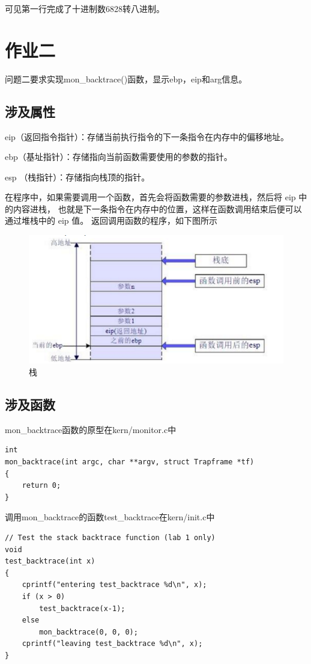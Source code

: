 \documentclass[12pt,a4paper,UTF8]{article}
\begin{document}
可见第一行完成了十进制数6828转八进制。

\section{作业二}

\setcounter{table}{0}
\setcounter{figure}{0}

问题二要求实现mon\_backtrace()函数，显示ebp，eip和arg信息。

	\subsection{涉及属性}
	eip（返回指令指针）：存储当前执行指令的下一条指令在内存中的偏移地址。

	ebp（基址指针）：存储指向当前函数需要使用的参数的指针。

	esp （栈指针）：存储指向栈顶的指针。

	在程序中，如果需要调用一个函数，首先会将函数需要的参数进栈，然后将 eip 中的内容进栈，
	也就是下一条指令在内存中的位置，这样在函数调用结束后便可以通过堆栈中的 eip 值。
	返回调用函数的程序，如下图所示
	\begin{figure}[H]
		\centering
		\includegraphics[width = .8\linewidth]{img/1.png}
		\caption{栈}
		\label{fig::figure2-1}
	\end{figure}

	\subsection{涉及函数}
	mon\_backtrace函数的原型在kern/monitor.c中
	\begin{lstlisting}[style=CPP]
int
mon_backtrace(int argc, char **argv, struct Trapframe *tf)
{
	return 0;
}
	\end{lstlisting}

	调用mon\_backtrace的函数test\_backtrace在kern/init.c中
	\begin{lstlisting}[style=CPP]
// Test the stack backtrace function (lab 1 only)
void
test_backtrace(int x)
{
	cprintf("entering test_backtrace %d\n", x);
	if (x > 0)
		test_backtrace(x-1);
	else
		mon_backtrace(0, 0, 0);
	cprintf("leaving test_backtrace %d\n", x);
}
	\end{lstlisting}
\end{document}
